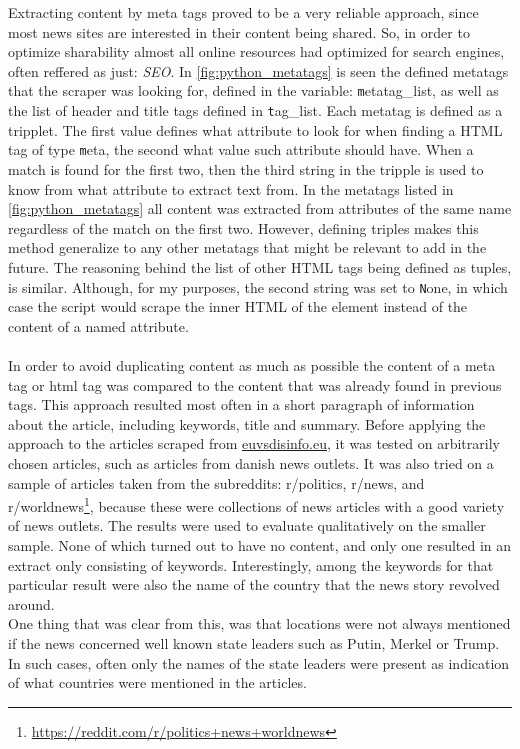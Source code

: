 \documentclass{article}
\begin{document}
Extracting content by meta tags proved to be a very reliable approach, since most news sites are interested in their content being shared. So, in order to optimize sharability almost all online resources had optimized for search engines, often reffered as just: {\it SEO}. In \cref{fig:python_metatags} is seen the defined metatags that the scraper was looking for, defined in the variable: {\texttt metatag\_list}, as well as the list of header and title tags defined in {\texttt tag\_list}. Each metatag is defined as a tripplet. The first value defines what attribute to look for when finding a HTML tag of type {\texttt meta}, the second what value such attribute should have. When a match is found for the first two, then the third string in the tripple is used to know from what attribute to extract text from. In the metatags listed in \cref{fig:python_metatags} all content was extracted from attributes of the same name regardless of the match on the first two. However, defining triples makes this method generalize to any other metatags that might be relevant to add in the future. The reasoning behind the list of other HTML tags being defined as tuples, is similar. Although, for my purposes, the second string was set to {\texttt None}, in which case the script would scrape the inner HTML of the element instead of the content of a named attribute.
\\\\
In order to avoid duplicating content as much as possible the content of a meta tag or html tag was compared to the content that was already found in previous tags. This approach resulted most often in a short paragraph of information about the article, including keywords, title and summary. Before applying the approach to the articles scraped from \href{https://www.euvsdisinfo.eu}{euvsdisinfo.eu}, it was tested on arbitrarily chosen articles, such as articles from danish news outlets. It was also tried on a sample of articles taken from the subreddits: r/politics, r/news, and {r/worldnews}\footnote{\url{https://reddit.com/r/politics+news+worldnews}}, because these were collections of news articles with a good variety of news outlets. The results were used to evaluate qualitatively on the smaller sample. None of which turned out to have no content, and only one resulted in an extract only consisting of keywords. Interestingly, among the keywords for that particular result were also the name of the country that the news story revolved around. \\
One thing that was clear from this, was that locations were not always mentioned if the news concerned well known state leaders such as Putin, Merkel or Trump. In such cases, often only the names of the state leaders were present as indication of what countries were mentioned in the articles.
\end{document}

